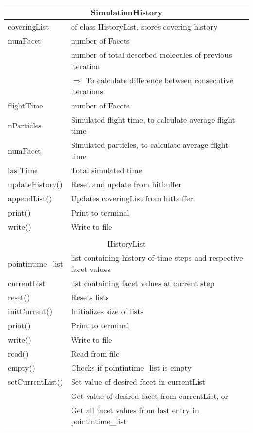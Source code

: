 \begin{center}
\begin{tabular}{|l|l|}
\hline
\multicolumn{2}{|c|}{\rule{0pt}{3ex}SimulationHistory}\\
\hline
\rule{0pt}{3ex} coveringList& of class HistoryList, stores covering history\\
\rule{0pt}{3ex} numFacet& number of Facets\\
\rule{0pt}{3ex} \multirow{2}{*}{nbDesorbed\_old}& number of total desorbed molecules of previous iteration\\
&\qquad$\Rightarrow$ To calculate difference between consecutive iterations\\
\rule{0pt}{3ex} flightTime& number of Facets\\
\rule{0pt}{3ex} nParticles& Simulated flight time, to calculate average flight time\\
\rule{0pt}{3ex} numFacet& Simulated particles, to calculate average flight time\\
\rule{0pt}{3ex} lastTime& Total simulated time\\
\hline
\rule{0pt}{3ex} updateHistory()& Reset and update from hitbuffer\\
\rule{0pt}{3ex} appendList()& Updates coveringList from hitbuffer\\
\rule{0pt}{3ex} print()& Print to terminal\\
\rule{0pt}{3ex} write()& Write to file\\
\hline
\multicolumn{2}{l}{}\\[1ex]
\hline
\multicolumn{2}{|c|}{\rule{0pt}{3ex}HistoryList}\\
\hline
\rule{0pt}{3ex} pointintime\_list& list containing history of time steps and respective facet values\\
\rule{0pt}{3ex} currentList& list containing facet values at current step\\
\hline
\rule{0pt}{3ex} reset()& Resets lists\\
\rule{0pt}{3ex} initCurrent()& Initializes size of lists\\
\rule{0pt}{3ex} print()& Print to terminal\\
\rule{0pt}{3ex} write()& Write to file\\
\rule{0pt}{3ex} read()& Read from file\\
\rule{0pt}{3ex} empty()& Checks if pointintime\_list is empty\\
\rule{0pt}{3ex} setCurrentList()& Set value of desired facet in currentList\\
\rule{0pt}{3ex} \multirow{2}{*}{getCurrent()}& Get value of desired facet from currentList, or\\
& Get all facet values from last entry in pointintime\_list\\
\hline
\end{tabular}
\end{center}


